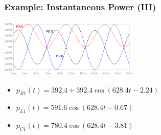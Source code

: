 \documentclass{beamer}
\begin{document}
\begin{frame}[fragile]
\frametitle{Example: Instantaneous Power (III)}

\vspace{-1cm}
\begin{center}
\includegraphics[width=0.5\textwidth]{src/Fig07a.png}
\end{center}

\begin{itemize}
\item $p_{R1}(t) = 392.4 + 392.4 \cos(628.4 t -2.24)$
\item $p_{L1}(t) = 591.6 \cos(628.4 t - 0.67)$
\item $p_{C1}(t) = 780.4 \cos(628.4 t - 3.81)$
\end{itemize}

\end{frame}

\end{document}
